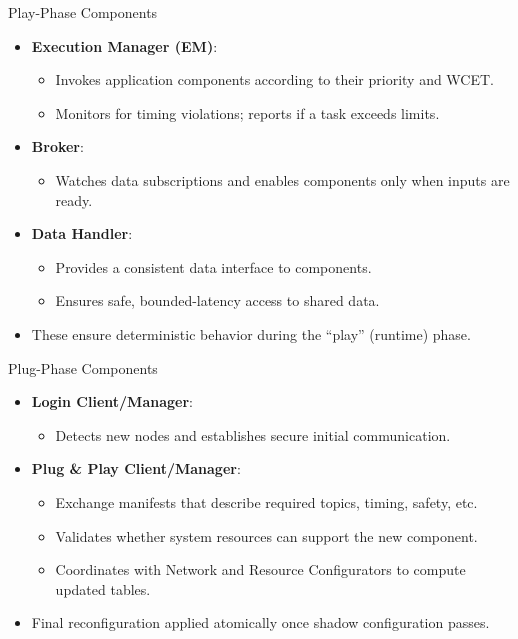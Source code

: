 \documentclass{beamer}
\begin{document}
\begin{frame}{Play-Phase Components}
  \begin{itemize}
    \item \textbf{Execution Manager (EM)}:
    \begin{itemize}
      \item Invokes application components according to their priority and WCET.
      \item Monitors for timing violations; reports if a task exceeds limits.
    \end{itemize}
    \item \textbf{Broker}:
    \begin{itemize}
      \item Watches data subscriptions and enables components only when inputs are ready.
    \end{itemize}
    \item \textbf{Data Handler}:
    \begin{itemize}
      \item Provides a consistent data interface to components.
      \item Ensures safe, bounded-latency access to shared data.
    \end{itemize}
    \item These ensure deterministic behavior during the “play” (runtime) phase.
  \end{itemize}
\end{frame}

\begin{frame}{Plug-Phase Components}
  \begin{itemize}
    \item \textbf{Login Client/Manager}:
    \begin{itemize}
      \item Detects new nodes and establishes secure initial communication.
    \end{itemize}
    \item \textbf{Plug \& Play Client/Manager}:
    \begin{itemize}
      \item Exchange manifests that describe required topics, timing, safety, etc.
      \item Validates whether system resources can support the new component.
      \item Coordinates with Network and Resource Configurators to compute updated tables.
    \end{itemize}
    \item Final reconfiguration applied atomically once shadow configuration passes.
  \end{itemize}
\end{frame}
\end{document}
